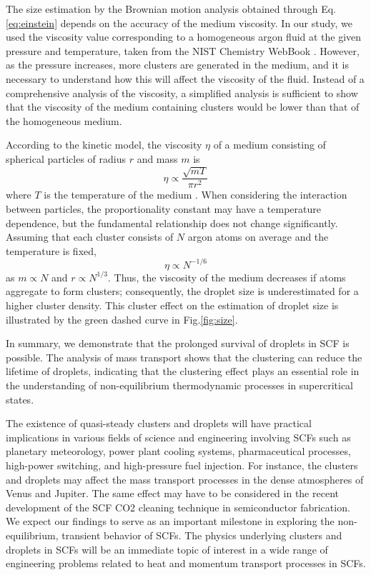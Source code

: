The size estimation by the Brownian motion analysis obtained through Eq.\ref{eq:einstein} depends on the accuracy of the medium viscosity. In our study, we used the viscosity value corresponding to a homogeneous argon fluid at the given pressure and temperature, taken from the NIST Chemistry WebBook \cite{linstorm2020nist}. However, as the pressure increases, more clusters are generated in the medium, and it is necessary to understand how this will affect the viscosity of the fluid. Instead of a comprehensive analysis of the viscosity, a simplified analysis is sufficient to show that the viscosity of the medium containing clusters would be lower than that of the homogeneous medium.

According to the kinetic model, the viscosity $\eta$ of a medium consisting of spherical particles of radius $r$ and mass $m$ is
\begin{equation}
\eta \propto \frac{\sqrt{m T}}{\pi r^{2}}
\end{equation}
where $T$ is the temperature of the medium \cite{chapman1990mathematical}. When considering the interaction between particles, the proportionality constant may have a temperature dependence, but the fundamental relationship does not change significantly. Assuming that each cluster consists of $N$ argon atoms on average and the temperature is fixed,
\begin{equation}
\eta \propto N^{-1 / 6}
\end{equation}
as $m \propto N$ and $r \propto N^{1/3}$. Thus, the viscosity of the medium decreases if atoms aggregate to form clusters; consequently, the droplet size is underestimated for a higher cluster density. This cluster effect on the estimation of droplet size is illustrated by the green dashed curve in Fig.\ref{fig:size}.

In summary, we demonstrate that the prolonged survival of droplets in SCF is possible. The analysis of mass transport shows that the clustering can reduce the lifetime of droplets, indicating that the clustering effect plays an essential role in the understanding of non-equilibrium thermodynamic processes in supercritical states.

The existence of quasi-steady clusters and droplets will have practical implications in various fields of science and engineering involving SCFs such as planetary meteorology, power plant cooling systems, pharmaceutical processes, high-power switching, and high-pressure fuel injection. For instance, the clusters and droplets may affect the mass transport processes in the dense atmospheres of Venus and Jupiter. The same effect may have to be considered in the recent development of the SCF CO2 cleaning technique in semiconductor fabrication. We expect our findings to serve as an important milestone in exploring the non-equilibrium, transient behavior of SCFs. The physics underlying clusters and droplets in SCFs will be an immediate topic of interest in a wide range of engineering problems related to heat and momentum transport processes in SCFs.

